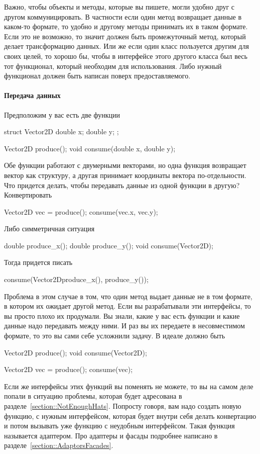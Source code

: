 Важно, чтобы объекты и методы, которые вы пишете, могли удобно друг с другом коммуницировать.
В частности если один метод возвращает данные в каком-то формате, то удобно и другому методы принимать их в таком формате.
Если это не возможно, то значит должен быть промежуточный метод, который делает трансформацию данных.
Или же если один класс пользуется другим для своих целей, то хорошо бы, чтобы в интерфейсе этого другого класса был весь тот функционал, который необходим для использования.
Либо нужный функционал должен быть написан поверх предоставляемого.

\paragraph{Передача данных}

Предположим у вас есть две функции
\begin{cppcode}
struct Vector2D {
  double x;
  double y;
};

Vector2D produce();
void consume(double x, double y);
\end{cppcode}
Обе функции работают с двумерными векторами, но одна функция возвращает вектор как структуру, а другая принимает координаты вектора по-отдельности.
Что придется делать, чтобы передавать данные из одной функции в другую?
Конвертировать
\begin{cppcode}
Vector2D vec = produce();
consume(vec.x, vec.y);
\end{cppcode}
Либо симметричная ситуация
\begin{cppcode}
double produce_x();
double produce_y();
void consume(Vector2D);
\end{cppcode}
Тогда придется писать
\begin{cppcode}
consume(Vector2D{produce_x(), produce_y()});
\end{cppcode}
Проблема в этом случае в том, что один метод выдает данные не в том формате, в котором их ожидает другой метод.
Если вы разрабатывали эти интерфейсы, то вы просто плохо их продумали.
Вы знали, какие у вас есть функции и какие данные надо передавать между ними.
И раз вы их передаете в несовместимом формате, то это вы сами себе усложнили задачу.
В идеале должно быть
\begin{cppcode}
Vector2D produce();
void consume(Vector2D);

Vector2D vec = produce();
consume(vec);
\end{cppcode}
Если же интерфейсы этих функций вы поменять не можете, то вы на самом деле попали в ситуацию проблемы, которая будет адресована в разделе~\ref{section::NotEnoughHats}.
Попросту говоря, вам надо создать новую функцию, с нужным интерфейсом, которая будет внутри себя делать конвертацию и потом вызывать уже функцию с неудобным интерфейсом.
Такая функция называется адаптером.
Про адаптеры и фасады подробнее написано в разделе~\ref{section::AdaptorsFacades}.

